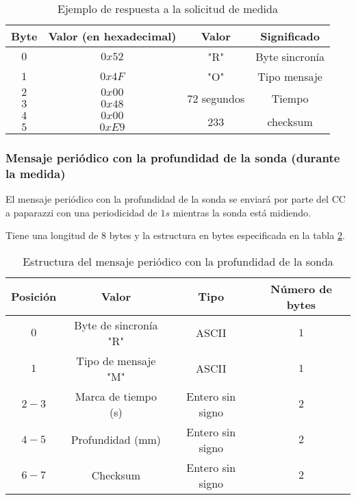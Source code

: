 \begin{table}
	\centering
	\caption{Ejemplo de respuesta a la solicitud de medida}
	\begin{tabular}{|c|c|c|c|}\hline
		\textbf{Byte} 	&	\textbf{Valor (en hexadecimal)}	&\textbf{Valor}	&\textbf{Significado} \\ \hline \hline
		$0$ 			&  $0x52$			& "R"	& Byte sincronía	\\ \hline
		$1$				&  $0x4F$			& "O"	& Tipo mensaje		\\ \hline
		$2$				&  $0x00$			& \multirow{2}{*}{$72$ segundos} & \multirow{2}{*}{Tiempo} \\
		$3$				&  $0x48$			&  & \\ \hline	
		$4$				&  $0x00$			&  \multirow{2}{*}{233}	& \multirow{2}{*}{checksum} \\
		$5$				&  $0xE9$			&     &     \\ \hline	
		
		
	\end{tabular}
	\label{tab9}
\end{table}

\subsubsection{Mensaje periódico con la profundidad de la sonda (durante la medida)}

El mensaje periódico con la profundidad de la sonda se enviará por parte del CC a paparazzi con una periodicidad de $1s$ mientras la sonda está midiendo.

Tiene una longitud de $8$ bytes y la estructura en bytes especificada en la tabla \ref{tab10}.

\begin{table}[h]
	\centering
	\caption{Estructura del mensaje periódico con la profundidad de la sonda}
	\begin{tabular}{|c|c|c|c|}\hline 
		\textbf{Posición}	& \textbf{Valor} & \textbf{Tipo} &\textbf{Número de bytes} \\ \hline \hline 
		$0$		& Byte de sincronía "R"				& ASCII	 			&	$1$ \\  \hline
		$1$		& Tipo de mensaje "M"				& ASCII	 			&	$1$ \\  \hline
		$2-3$	& Marca de tiempo (s)				& Entero sin signo	&   $2$ \\  \hline
		$4-5$	& Profundidad (mm)  				& Entero sin signo	&   $2$ \\  \hline
		$6-7$	& Checksum 							& Entero sin signo	&   $2$ \\  \hline
	\end{tabular}
\label{tab10}
\end{table}

